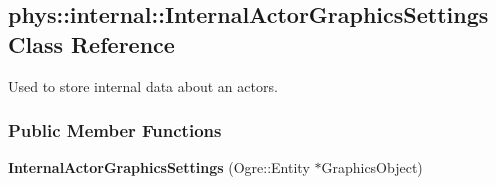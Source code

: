 \hypertarget{classphys_1_1internal_1_1InternalActorGraphicsSettings}{
\subsection{phys::internal::InternalActorGraphicsSettings Class Reference}
\label{classphys_1_1internal_1_1InternalActorGraphicsSettings}
}


Used to store internal data about an actors.  


\subsubsection*{Public Member Functions}
\begin{DoxyCompactItemize}
\item 
\hypertarget{classphys_1_1internal_1_1InternalActorGraphicsSettings_a01e31422fbe32ed2ed192f7ec9c654b2}{
{\bfseries InternalActorGraphicsSettings} (Ogre::Entity $\ast$GraphicsObject)}
\label{classphys_1_1internal_1_1InternalActorGraphicsSettings_a01e31422fbe32ed2ed192f7ec9c654b2}

\end{DoxyCompactItemize}
